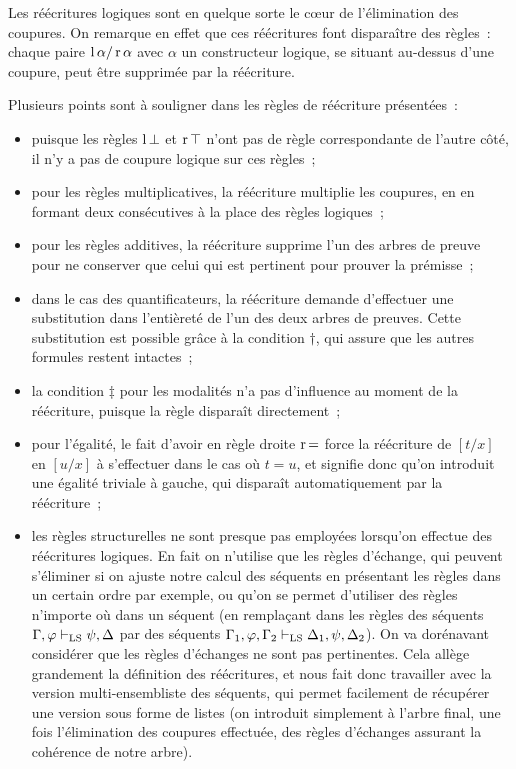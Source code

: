 Les réécritures logiques sont en quelque sorte le c{\oe}ur de l'élimination des
coupures. On remarque en effet que ces réécritures font disparaître des règles~:
chaque paire $\operatorname{l}\alpha/\operatorname{r}\alpha$ avec $\alpha$ un constructeur
logique, se situant au-dessus d'une coupure, peut être supprimée par la
réécriture.

\begin{remark}
  Plusieurs points sont à souligner dans les règles de réécriture présentées~:
  \begin{itemize}
  \item puisque les règles $\operatorname{l}\mathord{\bot}$ et $\operatorname{r}\mathord{\top}$ n'ont pas de règle
    correspondante de l'autre côté, il n'y a pas de coupure logique sur ces
    règles~;
  \item pour les règles multiplicatives, la réécriture multiplie les coupures,
    en en formant deux consécutives à la place des règles logiques~;
  \item pour les règles additives, la réécriture supprime l'un des arbres de
    preuve pour ne conserver que celui qui est pertinent pour prouver la
    prémisse~;
  \item dans le cas des quantificateurs, la réécriture demande d'effectuer une
    substitution dans l'entièreté de l'un des deux arbres de preuves. Cette
    substitution est possible grâce à la condition $\dagger$, qui assure que
    les autres formules restent intactes~;
  \item la condition $\ddagger$ pour les modalités n'a pas d'influence au
    moment de la réécriture, puisque la règle disparaît directement~;
  \item pour l'égalité, le fait d'avoir en règle droite $\operatorname{r}\mathord{=}$ force la
    réécriture de $[t/x]$ en $[u/x]$ à s'effectuer dans le cas où $t = u$, et
    signifie donc qu'on introduit une égalité triviale à gauche, qui
    disparaît automatiquement par la réécriture~;
  \item les règles structurelles ne sont presque pas employées lorsqu'on
    effectue des réécritures logiques. En fait on n'utilise que les règles
    d'échange, qui peuvent s'éliminer si on ajuste notre calcul des séquents
    en présentant les règles dans un certain ordre par exemple, ou qu'on se
    permet d'utiliser des règles n'importe où dans un séquent (en remplaçant
    dans les règles des séquents $\Gamma,\varphi\vdash_{\operatorname{LS}}\psi,\Delta$ par des
    séquents $\Gamma_1,\varphi,\Gamma_2\vdash_{\operatorname{LS}}\Delta_1,\psi,\Delta_2$). On va
    dorénavant considérer que les règles d'échanges ne sont pas pertinentes.
    Cela allège grandement la définition des réécritures, et nous fait donc
    travailler avec la version multi-ensembliste des séquents, qui permet
    facilement de récupérer une version sous forme de listes (on introduit
    simplement à l'arbre final, une fois l'élimination des coupures
    effectuée, des règles d'échanges assurant la cohérence de notre arbre).
  \end{itemize}
\end{remark}

